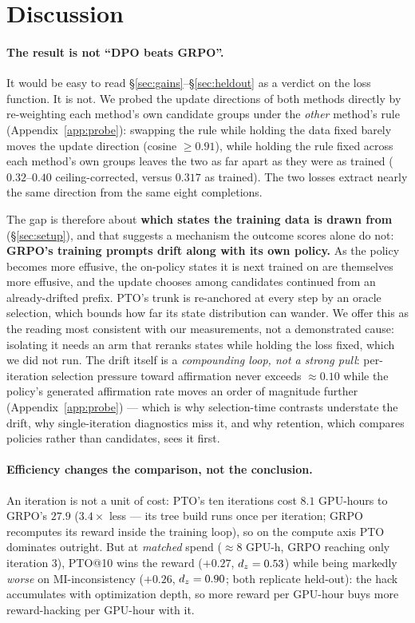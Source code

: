 \section{Discussion}
\label{sec:discussion}

\paragraph{The result is not ``DPO beats GRPO''.} It would be easy to read
\S\ref{sec:gains}--\S\ref{sec:heldout} as a verdict on the loss function. It is not. We probed
the update directions of both methods directly by re-weighting each method's own candidate
groups under the \emph{other} method's rule (Appendix~\ref{app:probe}): swapping the rule while
holding the data fixed barely moves the update direction (cosine $\geq0.91$), while holding the
rule fixed across each method's own groups leaves the two as far apart as they were as trained
($0.32$--$0.40$ ceiling-corrected, versus $0.317$ as trained). The two losses extract nearly the
same direction from the same eight completions.

The gap is therefore about \textbf{which states the training data is drawn from}
(\S\ref{sec:setup}), and that suggests a mechanism the outcome scores alone do not:
\textbf{GRPO's training prompts drift along with its own policy.} As the policy becomes more
effusive, the on-policy states it is next trained on are themselves more effusive, and the
update chooses among candidates continued from an already-drifted prefix. PTO's trunk is
re-anchored at every step by an oracle selection, which bounds how far its state distribution
can wander. We offer this as the reading most consistent with our measurements, not a
demonstrated cause: isolating it needs an arm that reranks states while holding the loss fixed,
which we did not run. The drift itself is a \emph{compounding loop, not a strong pull}:
per-iteration selection pressure toward affirmation never exceeds ${\approx}0.10$ while the
policy's generated affirmation rate moves an order of magnitude further
(Appendix~\ref{app:probe}) --- which is why selection-time contrasts understate the drift,
why single-iteration diagnostics miss it, and why retention, which compares policies rather
than candidates, sees it first.

\paragraph{Efficiency changes the comparison, not the conclusion.} An iteration is not a unit
of cost: PTO's ten iterations cost $8.1$ GPU-hours to GRPO's $27.9$ ($3.4\times$ less --- its
tree build runs once per iteration; GRPO recomputes its reward inside the training loop), so on
the compute axis PTO dominates outright. But at \emph{matched} spend (${\approx}8$ GPU-h, GRPO
reaching only iteration 3), PTO@10 wins the reward ($+0.27$, $d_z{}=0.53$) while being markedly
\emph{worse} on MI-inconsistency ($+0.26$, $d_z{}=0.90$; both replicate held-out): the hack
accumulates with optimization depth, so more reward per GPU-hour buys more reward-hacking per
GPU-hour with it.

